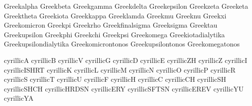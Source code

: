  Greekalpha              {}
 Greekbeta               {}
 Greekgamma              {}
 Greekdelta              {}
 Greekepsilon            {}
 Greekzeta               {}
 Greeketa                {}
 Greektheta              {}
 Greekiota               {}
 Greekkappa              {}
 Greeklamda              {}
 Greekmu                 {}
 Greeknu                 {}
 Greekxi                 {}
 Greekomicron            {}
 Greekpi                 {}
 Greekrho                {}
 Greekfinalsigma         {}
 Greeksigma              {}
 Greektau                {}
 Greekupsilon            {}
 Greekphi                {}
 Greekchi                {}
 Greekpsi                {}
 Greekomega              {}
 Greekiotadialytika      {}
 Greekupsilondialytika   {}
 Greekomicrontonos       {}
 Greekupsilontonos       {}
 Greekomegatonos         {}

 cyrillicA     {}
 cyrillicB     {}
 cyrillicV     {}
 cyrillicG     {}
 cyrillicD     {}
 cyrillicE     {}
 cyrillicZH    {}
 cyrillicZ     {}
 cyrillicI     {}
 cyrillicISHRT {}
 cyrillicK     {}
 cyrillicL     {}
 cyrillicM     {}
 cyrillicN     {}
 cyrillicO     {}
 cyrillicP     {}
 cyrillicR     {}
 cyrillicS     {}
 cyrillicT     {}
 cyrillicU     {}
 cyrillicF     {}
 cyrillicH     {}
 cyrillicC     {}
 cyrillicCH    {}
 cyrillicSH    {}
 cyrillicSHCH  {}
 cyrillicHRDSN {}
 cyrillicERY   {}
 cyrillicSFTSN {}
 cyrillicEREV  {}
 cyrillicYU    {}
 cyrillicYA    {}

